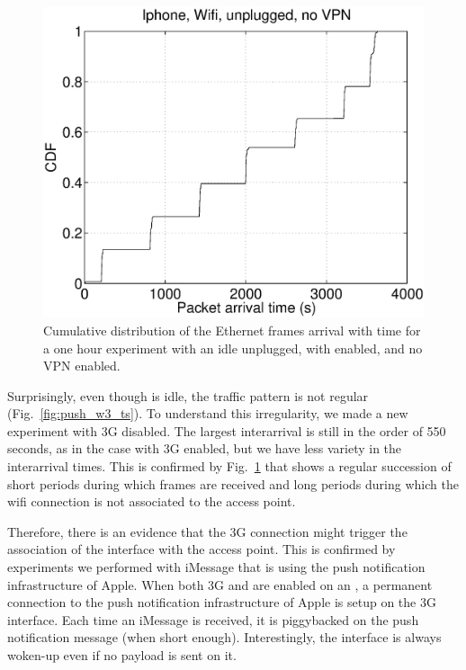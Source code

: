 \begin{figure}
\centering
        \includegraphics[width=0.8\linewidth]{../../code/pushNotification/Fig/bw_iphone_wifi_unplug_novpn_ts.eps}
  \caption{Cumulative distribution of the Ethernet frames
          arrival with time for a one hour experiment with an idle
          \iphone{} unplugged, with \wifi{} enabled, and no VPN
          enabled.}
  \label{fig:push_w_ts}
\end{figure}

Surprisingly, even though \iphone{} is idle, the traffic pattern
is not regular (Fig.~\ref{fig:push_w3_ts}). To
understand this irregularity, we made a new experiment with 3G
disabled. The largest
interarrival is still in the order of 550 seconds, as in the case with
3G enabled, but we have less variety in the interarrival times. This
is confirmed by Fig.~\ref{fig:push_w_ts} that shows a regular
succession of short periods during which frames are received and long
periods during which the wifi connection is not associated to the
access point.

Therefore, there is an evidence that the 3G connection might trigger
the association of the \iphone{} \wifi interface with the access
point. This is confirmed by experiments we performed with iMessage
that is using the push notification infrastructure of Apple. When both
3G and \wifi{} are enabled on an \iphone{}, a permanent connection to
the push notification infrastructure of Apple is setup on the 3G
interface. Each time an iMessage is received, it is piggybacked on the
push notification message (when short enough). Interestingly, the \wifi{}
interface is always woken-up even if no payload is sent on it. 

